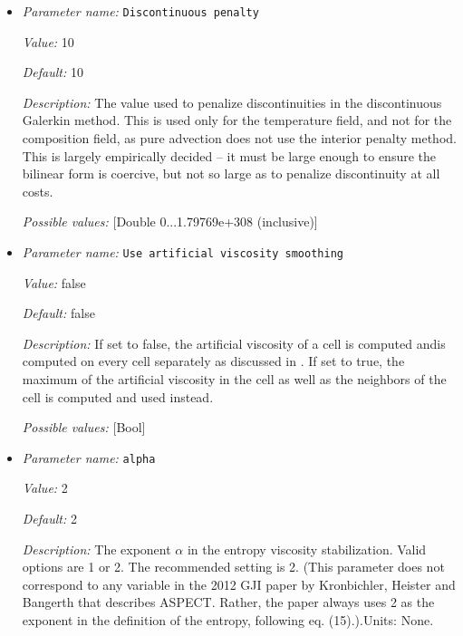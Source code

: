 \begin{itemize}
\item {\it Parameter name:} {\tt Discontinuous penalty}
\label{parameters:Discretization/Stabilization parameters/Discontinuous penalty}


{\it Value:} 10


{\it Default:} 10


{\it Description:} The value used to penalize discontinuities in the discontinuous Galerkin method. This is used only for the temperature field, and not for the composition field, as pure advection does not use the interior penalty method. This is largely empirically decided -- it must be large enough to ensure the bilinear form is coercive, but not so large as to penalize discontinuity at all costs.


{\it Possible values:} [Double 0...1.79769e+308 (inclusive)]
\item {\it Parameter name:} {\tt Use artificial viscosity smoothing}
\label{parameters:Discretization/Stabilization parameters/Use artificial viscosity smoothing}


{\it Value:} false


{\it Default:} false


{\it Description:} If set to false, the artificial viscosity of a cell is computed andis computed on every cell separately as discussed in \cite{KHB12}. If set to true, the maximum of the artificial viscosity in the cell as well as the neighbors of the cell is computed and used instead.


{\it Possible values:} [Bool]
\item {\it Parameter name:} {\tt alpha}
\label{parameters:Discretization/Stabilization parameters/alpha}


{\it Value:} 2


{\it Default:} 2


{\it Description:} The exponent $\alpha$ in the entropy viscosity stabilization. Valid options are 1 or 2. The recommended setting is 2. (This parameter does not correspond to any variable in the 2012 GJI paper by Kronbichler, Heister and Bangerth that describes ASPECT. Rather, the paper always uses 2 as the exponent in the definition of the entropy, following eq. (15).).Units: None.



\end{itemize}
